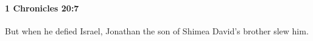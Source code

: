 
		\paragraph{1 Chronicles 20:7} %
			\label{1CHRONICLES-20-7}

			But when he defied Israel, Jonathan the son of Shimea David’s brother slew him.


